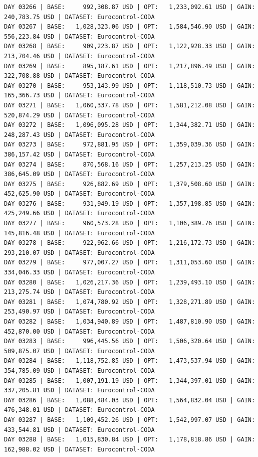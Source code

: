 \documentclass[11pt,a4paper]{article}
\begin{document}
\begin{verbatim}
DAY 03266 | BASE:     992,308.87 USD | OPT:   1,233,092.61 USD | GAIN: 240,783.75 USD | DATASET: Eurocontrol-CODA
DAY 03267 | BASE:   1,028,323.06 USD | OPT:   1,584,546.90 USD | GAIN: 556,223.84 USD | DATASET: Eurocontrol-CODA
DAY 03268 | BASE:     909,223.87 USD | OPT:   1,122,928.33 USD | GAIN: 213,704.46 USD | DATASET: Eurocontrol-CODA
DAY 03269 | BASE:     895,187.61 USD | OPT:   1,217,896.49 USD | GAIN: 322,708.88 USD | DATASET: Eurocontrol-CODA
DAY 03270 | BASE:     953,143.99 USD | OPT:   1,118,510.73 USD | GAIN: 165,366.73 USD | DATASET: Eurocontrol-CODA
DAY 03271 | BASE:   1,060,337.78 USD | OPT:   1,581,212.08 USD | GAIN: 520,874.29 USD | DATASET: Eurocontrol-CODA
DAY 03272 | BASE:   1,096,095.28 USD | OPT:   1,344,382.71 USD | GAIN: 248,287.43 USD | DATASET: Eurocontrol-CODA
DAY 03273 | BASE:     972,881.95 USD | OPT:   1,359,039.36 USD | GAIN: 386,157.42 USD | DATASET: Eurocontrol-CODA
DAY 03274 | BASE:     870,568.16 USD | OPT:   1,257,213.25 USD | GAIN: 386,645.09 USD | DATASET: Eurocontrol-CODA
DAY 03275 | BASE:     926,882.69 USD | OPT:   1,379,508.60 USD | GAIN: 452,625.90 USD | DATASET: Eurocontrol-CODA
DAY 03276 | BASE:     931,949.19 USD | OPT:   1,357,198.85 USD | GAIN: 425,249.66 USD | DATASET: Eurocontrol-CODA
DAY 03277 | BASE:     960,573.28 USD | OPT:   1,106,389.76 USD | GAIN: 145,816.48 USD | DATASET: Eurocontrol-CODA
DAY 03278 | BASE:     922,962.66 USD | OPT:   1,216,172.73 USD | GAIN: 293,210.07 USD | DATASET: Eurocontrol-CODA
DAY 03279 | BASE:     977,007.27 USD | OPT:   1,311,053.60 USD | GAIN: 334,046.33 USD | DATASET: Eurocontrol-CODA
DAY 03280 | BASE:   1,026,217.36 USD | OPT:   1,239,493.10 USD | GAIN: 213,275.74 USD | DATASET: Eurocontrol-CODA
DAY 03281 | BASE:   1,074,780.92 USD | OPT:   1,328,271.89 USD | GAIN: 253,490.97 USD | DATASET: Eurocontrol-CODA
DAY 03282 | BASE:   1,034,940.89 USD | OPT:   1,487,810.90 USD | GAIN: 452,870.00 USD | DATASET: Eurocontrol-CODA
DAY 03283 | BASE:     996,445.56 USD | OPT:   1,506,320.64 USD | GAIN: 509,875.07 USD | DATASET: Eurocontrol-CODA
DAY 03284 | BASE:   1,118,752.85 USD | OPT:   1,473,537.94 USD | GAIN: 354,785.09 USD | DATASET: Eurocontrol-CODA
DAY 03285 | BASE:   1,007,191.19 USD | OPT:   1,344,397.01 USD | GAIN: 337,205.81 USD | DATASET: Eurocontrol-CODA
DAY 03286 | BASE:   1,088,484.03 USD | OPT:   1,564,832.04 USD | GAIN: 476,348.01 USD | DATASET: Eurocontrol-CODA
DAY 03287 | BASE:   1,109,452.26 USD | OPT:   1,542,997.07 USD | GAIN: 433,544.81 USD | DATASET: Eurocontrol-CODA
DAY 03288 | BASE:   1,015,830.84 USD | OPT:   1,178,818.86 USD | GAIN: 162,988.02 USD | DATASET: Eurocontrol-CODA

\end{verbatim}
\end{document}
